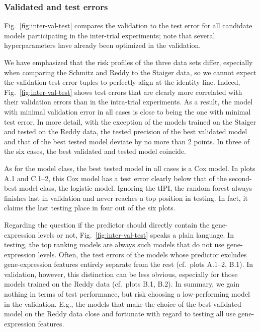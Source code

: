 \subsubsection{Validated and test errors}



Fig.\ \ref{fig:inter-val-test} compares the validation to the test error for all candidate models 
participating in the inter-trial experiments; note that several hyperparameters have already 
been optimized in the validation. 

We have emphasized that the risk profiles of the three data sets differ, especially when comparing 
the Schmitz and Reddy to the Staiger data, so we cannot expect the validation-test-error tuples 
to perfectly align at the identity line. Indeed, Fig.\ 
\ref{fig:inter-val-test} shows test errors that are clearly more correlated with their validation 
errors than in the intra-trial experiments. As a result, the model with minimal validation error in all 
cases is close to being the one with minimal test error. In more detail, with the exception of 
the models trained on the Staiger and tested on the Reddy data, the tested precision of the best 
validated model and that of the best tested model deviate by no more than \num{2} points. In 
three of the six cases, the best validated and tested model coincide. 

As for the model class, the best tested model in all cases is a Cox model. In plots A.1 and C.1--2, 
this Cox model has a test error clearly below that of the second-best model class, the 
logistic model. Ignoring the tIPI, the random 
forest always finishes last in validation and never reaches a top position in testing. In fact, 
it claims the last testing place in four out of the six plots.

Regarding the question if the predictor should directly contain the gene-expression levels or not,
Fig.\ \ref{fig:inter-val-test} speaks a plain language. In testing, the top ranking models are 
always such models that do not use gene-expression levels. Often, the test errors of the models whose 
predictor excludes gene-expression features entirely separate from the rest (cf.\ plots A.1--2, B.1). 
In validation, however, this distinction can be less obvious, especially for those models trained on 
the Reddy data (cf.\ plots B.1, B.2). In summary, we gain nothing in terms of test 
performance, but risk choosing a low-performing model in the validation. E.g., the models that 
make the choice of the best validated model on the Reddy data 
close and fortunate with regard to testing all use gene-expression features. 

